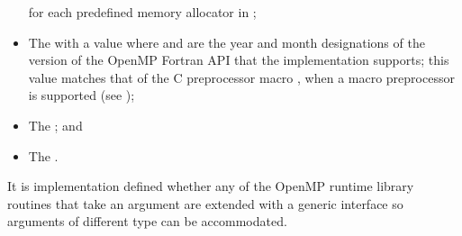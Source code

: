 \begin{fortranspecific}
\begin{itemize}
       for each predefined memory allocator 
      in ;
\item The    with 
      a value  where  and  are the year 
      and month designations of the version of the OpenMP Fortran
      API that the implementation supports; this value matches that 
      of the C preprocessor macro , when a macro 
      preprocessor is supported (see );
\item The   ; and
\item The   .
\end{itemize}

It is implementation defined whether any of the OpenMP runtime library 
routines that take an argument are extended with a generic interface so 
arguments of different  type can be accommodated. 
\end{fortranspecific}







